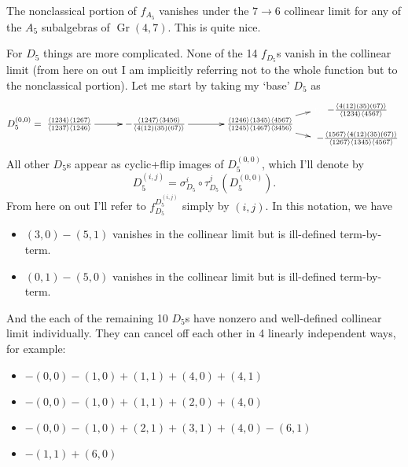 \documentclass[12pt]{article}
\DeclareMathOperator{\Gr}{Gr}
\begin{document}
\thispagestyle{fancyplain}
 
\fancyhf{}
 
\cfoot{\fancyplain{}{\thepage}}


The nonclassical portion of $f_{A_5}$ vanishes under the $7\to6$ collinear limit for any of the $A_5$ subalgebras of $\Gr(4,7)$. This is quite nice. 

For $D_5$ things are more complicated. None of the 14 $f_{D_5}$s vanish in the collinear limit (from here on out I am implicitly referring not to the whole function but to the nonclassical portion). Let me start by taking my `base' $D_5$ as
\begin{equation}
D_5^{(0,0)} = 	\begin{gathered}
    \begin{xy} 0;<1pt,0pt>:<0pt,-1pt>::
      (0,15) *+{\frac{\langle 1234\rangle  \langle 1267\rangle
   }{\langle 1237\rangle  \langle 1246\rangle }} ="1",
      (90,15) *+{-\frac{\langle 1247\rangle  \langle 3456\rangle
   }{\langle 4(12)(35)(67)\rangle }} ="2",
      (200,15) *+{\frac{\langle 1246\rangle  \langle 1345\rangle  \langle
   4567\rangle }{\langle 1245\rangle  \langle
   1467\rangle  \langle 3456\rangle }} ="3",
      (260,0) *+{\color{white} x_i} ="4",
      (260,30) *+{\color{white} x_i} ="5",
      (302,0) *+{-\frac{\langle 4(12)(35)(67)\rangle }{\langle
   1234\rangle  \langle 4567\rangle }} ="6",
      (302,30) *+{-\frac{\langle 1567\rangle  \langle
   4(12)(35)(67)\rangle }{\langle 1267\rangle  \langle
   1345\rangle  \langle 4567\rangle }} ="7",
      "1", {\ar"2"},
      "2", {\ar"3"},
      "3", {\ar"4"},
      "3", {\ar"5"},
    \end{xy}
    \end{gathered} 
\end{equation}
All other $D_5$s appear as cyclic+flip images of $D_5^{(0,0)}$, which I'll denote by 
\begin{equation}
	D_5^{(i,j)} = \sigma_{D_5}^i \circ \tau_{D_5}^j (D_5^{(0,0)}).	
\end{equation} 
From here on out I'll refer to $f_{D_5}^{D_5^{(i,j)}}$ simply by $(i,j)$. In this notation, we have 
\begin{itemize}
	\item $(3, 0)- (5, 1)$ vanishes in the collinear limit but is ill-defined term-by-term.
	\item $(0, 1) - (5, 0)$ vanishes in the collinear limit but is ill-defined term-by-term.
\end{itemize}
And the each of the remaining 10 $D_5$s have nonzero and well-defined collinear limit individually. They can cancel off each other in 4 linearly independent ways, for example: 
	\begin{itemize}
		\item $-(0, 0) - (1, 0) + (1, 1) + (4, 0) + (4, 1)$
		\item $-(0, 0) - (1, 0) + (1, 1) + (2, 0) + (4, 0)$
		\item $-(0, 0) - (1, 0) + (2, 1) + (3, 1) + (4, 0) - (6, 1)$
		\item $-(1, 1) + (6, 0)$
	\end{itemize}
\end{document}
